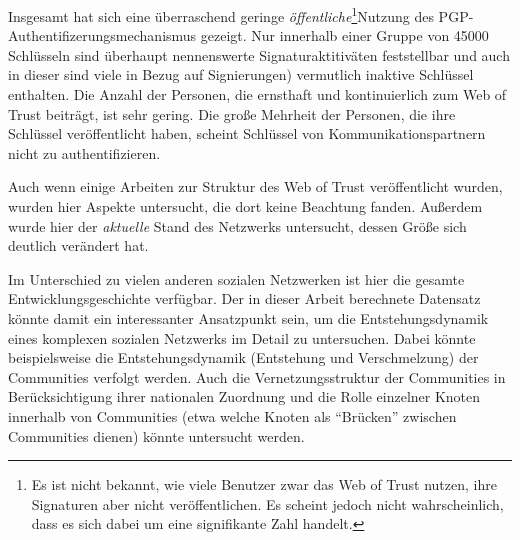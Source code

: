 Insgesamt hat sich eine überraschend geringe
\emph{öffentliche}\footnote{Es ist nicht bekannt, wie viele Benutzer
  zwar das Web of Trust nutzen, ihre Signaturen aber nicht
  veröffentlichen. Es scheint jedoch nicht wahrscheinlich, dass es
  sich dabei um eine signifikante Zahl handelt.}Nutzung des
PGP-Authentifizerungsmechanismus gezeigt. Nur innerhalb einer Gruppe
von 45000 Schlüsseln sind überhaupt nennenswerte
Signaturaktitiväten feststellbar und auch in dieser sind viele in
Bezug auf Signierungen) vermutlich inaktive Schlüssel enthalten. Die
Anzahl der Personen, die ernsthaft und kontinuierlich zum Web of Trust
beiträgt, ist sehr gering. Die große Mehrheit der Personen, die
ihre Schlüssel veröffentlicht haben, scheint Schlüssel von
Kommunikationspartnern nicht zu authentifizieren.

Auch wenn einige Arbeiten zur Struktur des Web of Trust
veröffentlicht wurden, wurden hier Aspekte untersucht, die dort
keine Beachtung fanden. Außerdem wurde hier der \emph{aktuelle} Stand
des Netzwerks untersucht, dessen Größe sich deutlich verändert
hat.

Im Unterschied zu vielen anderen sozialen Netzwerken ist hier die
gesamte Entwicklungsgeschichte verfügbar. Der in dieser Arbeit
berechnete Datensatz könnte damit ein interessanter Ansatzpunkt
sein, um die Entstehungsdynamik eines komplexen sozialen Netzwerks im
Detail zu untersuchen. Dabei könnte beispielsweise die
Entstehungsdynamik (Entstehung und Verschmelzung) der Communities
verfolgt werden. Auch die Vernetzungsstruktur der Communities in
Berücksichtigung ihrer nationalen Zuordnung und die Rolle einzelner
Knoten innerhalb von Communities (etwa welche Knoten als ``Brücken''
zwischen Communities dienen) könnte untersucht
werden.

